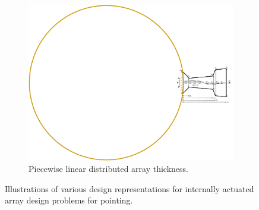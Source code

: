 \begin{figure}[t]
\begin{subfigure}[b]{0.52\columnwidth}
\centering 
\includegraphics[width=\columnwidth,trim=12.46in 4.8in 0in 5.1in,clip=true]{../ch7/figures/varbeam-c-vt-2}
\caption{Piecewise linear distributed array thickness.}\label{fig:ch7:varbeam-c-vt}
\end{subfigure}%

\caption{Illustrations of various design representations for internally actuated array design problems for pointing. \label{fig:ch7:varbeam}}
\end{figure}